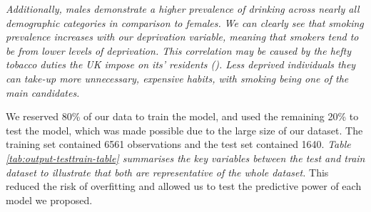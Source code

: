 \documentclass[
  11pt,
  twocolumn]{article}
\begin{document}
\emph{Additionally, males demonstrate a higher prevalence of drinking
across nearly all demographic categories in comparison to females.}
\emph{We can clearly see that smoking prevalence increases with our
deprivation variable, meaning that smokers tend to be from lower levels
of deprivation. This correlation may be caused by the hefty tobacco
duties the UK impose on its' residents (). Less deprived individuals they can take-up more unnecessary,
expensive habits, with smoking being one of the main candidates.}

We reserved 80\% of our data to train the model, and used the remaining
20\% to test the model, which was made possible due to the large size of
our dataset. The training set contained 6561 observations and the test
set contained 1640. \emph{Table \ref{tab:output-testtrain-table}
summarises the key variables between the test and train dataset to
illustrate that both are representative of the whole dataset.} This
reduced the risk of overfitting and allowed us to test the predictive
power of each model we proposed.
\end{document}

